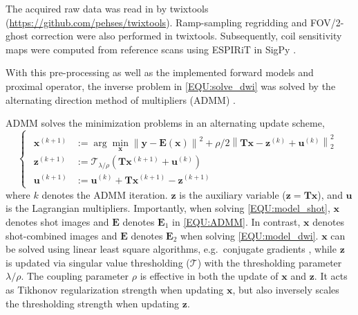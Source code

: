 \documentclass[preprint,12pt,authoryear,review]{elsarticle}
\newcommand*{\norm}[1]{\left\lVert#1\right\rVert}
\newcommand{\argmin}{\arg\!\min}
\begin{document}
    The acquired raw data was read in by twixtools
    (\url{https://github.com/pehses/twixtools}).
    Ramp-sampling regridding and FOV/2-ghost correction were also performed in twixtools.
    Subsequently, coil sensitivity maps were computed from reference scans
    using ESPIRiT \citep{uecker_2014_espirit} in SigPy \citep{ong_2019_sigpy}.

    With this pre-processing as well as
    the implemented forward models and proximal operator,
    the inverse problem in \cref{EQU:solve_dwi} was solved by
    the alternating direction method of multipliers (ADMM) \citep{boyd_2010_admm}.

    ADMM solves the minimization problems in an alternating update scheme,
    \begin{equation}
        \left\{\begin{matrix}
            \begin{aligned}
                \mathbf{x}^{(k+1)} &:= \argmin_{\mathbf{x}} \norm{\mathbf{y} - \mathbf{E}(\mathbf{x})}^2 + \rho/2 \norm{\mathbf{T}\mathbf{x} - \mathbf{z}^{(k)} + \mathbf{u}^{(k)}}_2^2 \\
                \mathbf{z}^{(k+1)} &:= \mathcal{T}_{\lambda/\rho} (\mathbf{T} \mathbf{x}^{(k+1)} + \mathbf{u}^{(k)}) \\
                \mathbf{u}^{(k+1)} &:= \mathbf{u}^{(k)} + \mathbf{T} \mathbf{x}^{(k+1)} - \mathbf{z}^{(k+1)}
            \end{aligned}
        \end{matrix}\right.
        \label{EQU:ADMM}
    \end{equation}
    where $k$ denotes the ADMM iteration.
    $\mathbf{z}$ is the auxiliary variable ($\mathbf{z} = \mathbf{T}\mathbf{x}$),
    and $\textbf{u}$ is the Lagrangian multipliers.
    Importantly, when solving \cref{EQU:model_shot},
    $\textbf{x}$ denotes shot images and $\mathbf{E}$ denotes $\mathbf{E}_1$ in \cref{EQU:ADMM}.
    In contrast, $\textbf{x}$ denotes shot-combined images and $\mathbf{E}$ denotes $\mathbf{E}_2$
    when solving \cref{EQU:model_dwi}.
    $\mathbf{x}$ can be solved using linear least square algorithms,
    e.g.~conjugate gradients \citep{hestenes_1952_cg},
    while $\mathbf{z}$ is updated via singular value thresholding
    ($\mathcal{T}$) with the thresholding parameter $\lambda / \rho$.
    The coupling parameter $\rho$ is effective in both the update of $\mathbf{x}$ and $\mathbf{z}$.
    It acts as Tikhonov regularization strength when updating $\mathbf{x}$,
    but also inversely scales the thresholding strength when updating $\mathbf{z}$.
\end{document}
